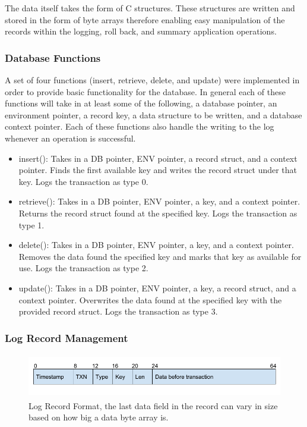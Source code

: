 \documentclass{article}
\begin{document}
The data itself takes the form of C structures. These structures are written and stored in the form of byte arrays therefore enabling easy manipulation of the records within the logging, roll back, and summary application operations.


\subsubsection{Database Functions}
A set of four functions (insert, retrieve, delete, and update) were implemented in order to provide basic functionality for the database. In general each of these functions will take in at least some of the following, a database pointer, an environment pointer, a record key, a data structure to be written, and a database context pointer. Each of these functions also handle the writing to the log whenever an operation is successful.

\begin{itemize}[noitemsep]
    \item insert(): Takes in a DB pointer, ENV pointer, a record struct, and a context pointer. Finds the first available key and writes the record struct under that key. Logs the transaction as type 0.
    \item retrieve(): Takes in a DB pointer, ENV pointer, a key, and a context pointer. Returns the record struct found at the specified key. Logs the transaction as type 1.
    \item delete(): Takes in a DB pointer, ENV pointer, a key, and a context pointer. Removes the data found the specified key and marks that key as available for use. Logs the transaction as type 2.
    \item update(): Takes in a DB pointer, ENV pointer, a key, a record struct, and a context pointer. Overwrites the data found at the specified key with the provided record struct. Logs the transaction as type 3.
\end{itemize}

\subsubsection{Log Record Management}

\begin{figure}
    \centering
    \includegraphics[height=0.75in]{LogRecordFormat.png}
    \caption{Log Record Format, the last data field in the record can vary in size based on how big a data byte array is.}
    \label{fig:design2}
\end{figure}
\end{document}
